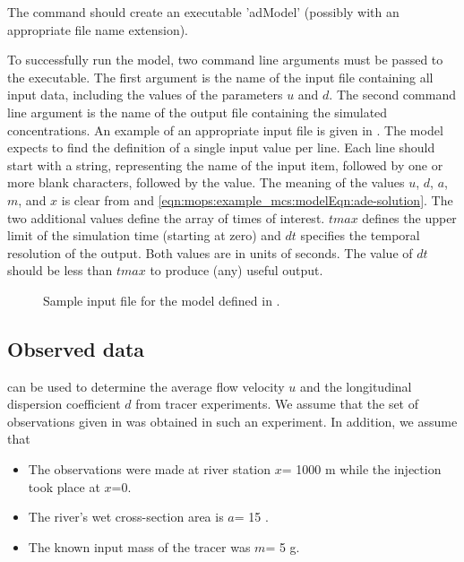 The command should create an executable 'adModel' (possibly with an appropriate file name extension).

To successfully run the model, two command line arguments must be passed to the executable. The first argument is the name of the input file containing all input data, including the values of the parameters $u$ and $d$. The second command line argument is the name of the output file containing the simulated concentrations. An example of an appropriate input file is given in . The model expects to find the definition of a single input value per line. Each line should start with a string, representing the name of the input item, followed by one or more blank characters, followed by the value. The meaning of the values $u$, $d$, $a$, $m$, and $x$ is clear from  and \ref{eqn:mops:example_mcs:modelEqn:ade-solution}. The two additional values define the array of times of interest. $tmax$ defines the upper limit of the simulation time (starting at zero) and $dt$ specifies the temporal resolution of the output. Both values are in units of seconds. The value of $dt$ should be less than $tmax$ to produce (any) useful output.

\begin{figure}
  
  \caption{Sample input file for the model defined in . \label{fig:mops:example_mcs:adModel_inputFixed}}
\end{figure}

\subsection{Observed data} \label{sec:mops:example_mcs:obsData}

 can be used to determine the average flow velocity $u$ and the longitudinal dispersion coefficient $d$ from tracer experiments. We assume that the set of observations given in  was obtained in such an experiment. In addition, we assume that
\begin{itemize}
  \item The observations were made at river station $x$= 1000 m while the injection took place at $x$=0.
  \item The river's wet cross-section area is $a$= 15 \sqm.
  \item The known input mass of the tracer was $m$= 5 g.
\end{itemize}

